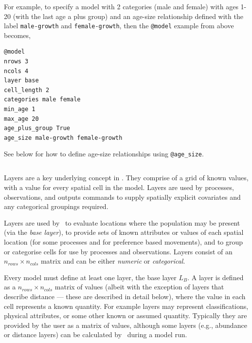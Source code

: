 For example, to specify a model with 2 categories (male and female) with ages 1-20 (with the last age a plus group) and an age-size relationship defined with the label \texttt{male-growth} and \texttt{female-growth}, then the \texttt{@model} example from above becomes,
{\small{\begin{verbatim}
@model
nrows 3
ncols 4
layer base
cell_length 2
categories male female
min_age 1
max_age 20
age_plus_group True
age_size male-growth female-growth
\end{verbatim}}}

See below for how to define age-size relationships using \texttt{@age\_size}. 

\subsection{\label{sec:layers}}

Layers are a key underlying concept in \SPM. They comprise of a grid of known values, with a value for every spatial cell in the model. Layers are used by processes, observations, and outputs commands to supply spatially explicit covariates and any categorical groupings required. 

Layers are used by \SPM\ to evaluate locations where the population may be present (via the \emph{base layer}), to provide sets of known attributes or values of each spatial location (for some processes and for preference based movements), and to group or categorise cells for use by processes and observations. Layers consist of an $n_{rows} \times n_{cols}$ matrix and can be either \emph{numeric} or \emph{categorical}. 

Every model must define at least one layer, the base layer $L_B$. A layer is defined as a $n_{rows} \times n_{cols}$ matrix of values (albeit with the exception of layers that describe distance --- these are described in detail below), where the value in each cell represents a known quantity. For example layers may represent classifications, physical attributes, or some other known or assumed quantity. Typically they are provided by the user as a matrix of values, although some layers (e.g., abundance or distance layers) can be calculated by \SPM\ during a model run. 

